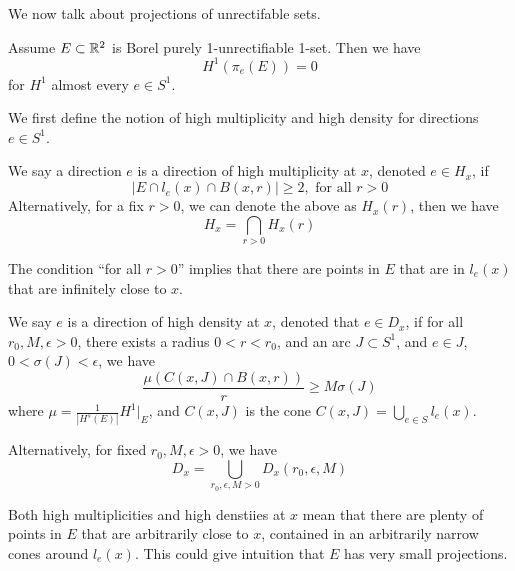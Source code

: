 We now talk about projections of unrectifable sets. 
\begin{theorem}[Besicovitch]
    Assume $E\subset \mathbb{R}^2$ is Borel purely 1-unrectifiable 1-set. Then we have 
    \begin{equation*}
        H^1(\pi_e(E))=0
    \end{equation*}
    for $H^1$ almost every $e\in S^1$.
\end{theorem}
We first define the notion of high multiplicity and high density for directions $e\in S^1$.

\begin{definition}
    We say a direction $e$ is a direction of high multiplicity at $x$, denoted $e\in H_x$, if
    \begin{equation*}
        |E\cap l_e(x)\cap B(x,r)|\geq 2, \text{ for all } r>0
    \end{equation*}
    Alternatively, for a fix $r>0$, we can denote the above as $H_x(r)$, then we have
    \begin{equation*}
        H_x=\bigcap_{r>0}H_x(r)
    \end{equation*}
\end{definition}
The condition ``for all $r>0$'' implies that there are points in $E$ that are in $l_e(x)$ that are infinitely close to $x$.

\begin{definition}
    We say $e$ is a direction of high density at $x$, denoted that $e\in D_x$, if for all $r_0, M, \epsilon>0$, there exists a radius $0<r<r_0$, and an arc $J\subset S^1$, and $e\in J$, $0<\sigma(J)<\epsilon$, we have
    \begin{equation*}
        \frac{\mu(C(x,J)\cap B(x,r))}{r}\geq M\sigma(J)
    \end{equation*}
    where $\mu=\frac{1}{|H^s(E)|}H^1\vert_E$, and $C(x, J)$ is the cone $C(x,J)=\bigcup_{e\in S}l_e(x)$.

    Alternatively, for fixed $r_0, M, \epsilon>0$, we have
    \begin{equation*}
        D_x=\bigcup_{r_0, \epsilon, M>0}D_x(r_0,\epsilon, M)
    \end{equation*}
\end{definition}
\begin{note}
    Both high multiplicities and high denstiies at $x$ mean that there are plenty of points in $E$ that are arbitrarily close to $x$, contained in an arbitrarily narrow cones around $l_e(x)$. This could give intuition that $E$ has very small projections.
\end{note}

